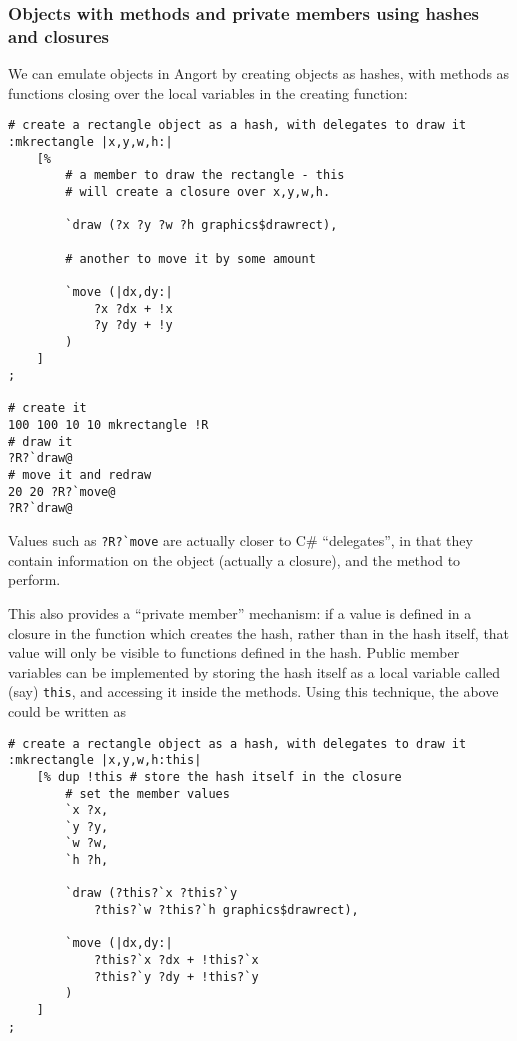 \subsubsection{Objects with methods and private members using hashes and closures}
We can emulate objects in Angort by creating objects as
hashes, with methods as functions closing over the local variables
in the creating function:

\begin{lstlisting}
# create a rectangle object as a hash, with delegates to draw it
:mkrectangle |x,y,w,h:|
    [%
        # a member to draw the rectangle - this
        # will create a closure over x,y,w,h.
        
        `draw (?x ?y ?w ?h graphics$drawrect),
        
        # another to move it by some amount
        
        `move (|dx,dy:| 
            ?x ?dx + !x
            ?y ?dy + !y
        )
    ]
;   

# create it
100 100 10 10 mkrectangle !R
# draw it
?R?`draw@
# move it and redraw
20 20 ?R?`move@
?R?`draw@
\end{lstlisting}
Values such as \verb+?R?`move+ are actually closer to C\# ``delegates'', in that they 
contain information on the object (actually a closure), and the method to perform.

This also provides a ``private member'' mechanism: if a value is defined
in a closure in the function which creates the hash, rather than in
the hash itself, that value will only be visible to functions defined
in the hash. Public member variables can be implemented by storing the hash
itself as a local variable called (say) \texttt{this}, and accessing it inside
the methods. Using this technique, the above could be written as 
\begin{lstlisting}
# create a rectangle object as a hash, with delegates to draw it
:mkrectangle |x,y,w,h:this|
    [% dup !this # store the hash itself in the closure
        # set the member values
        `x ?x,
        `y ?y,
        `w ?w,
        `h ?h,
        
        `draw (?this?`x ?this?`y 
            ?this?`w ?this?`h graphics$drawrect),
        
        `move (|dx,dy:| 
            ?this?`x ?dx + !this?`x
            ?this?`y ?dy + !this?`y
        )
    ]
;   
\end{lstlisting}


